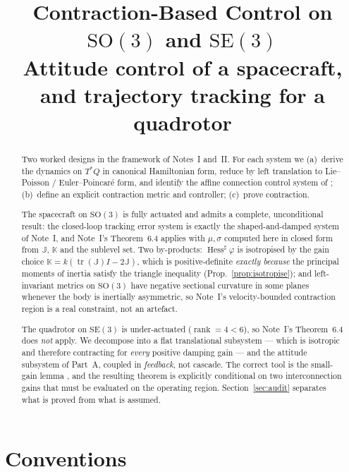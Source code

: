 \documentclass[11pt,a4paper]{article}
\title{\bfseries Contraction-Based Control on $\mathrm{SO}(3)$ and $\mathrm{SE}(3)$\\[3pt]
\large Attitude control of a spacecraft, and trajectory tracking for a quadrotor}
\date{}
\author{}
\newcommand{\Jm}{\mathbb{J}}
\newcommand{\Km}{\mathbb{K}}
\newcommand{\Hess}{\operatorname{Hess}}
\newcommand{\SO}{\mathrm{SO}(3)}
\newcommand{\SE}{\mathrm{SE}(3)}
\newcommand{\tr}{\operatorname{tr}}
\DeclareMathOperator{\rank}{rank}
\theoremstyle{plain}
\theoremstyle{definition}
\theoremstyle{remark}
\begin{document}
\maketitle
\vspace{-2.4\baselineskip}

\begin{abstract}
\noindent
Two worked designs in the framework of Notes~I and~II. For each system we
(a)~derive the dynamics on $T^{*}Q$ in canonical Hamiltonian form, reduce by
left translation to Lie--Poisson / Euler--Poincar\'e form, and identify the
affine connection control system of \cite[\S4.6.3]{BL04}; (b)~define an explicit
contraction metric and controller; (c)~prove contraction.

The spacecraft on $\SO$ is fully actuated and admits a complete, unconditional
result: the closed-loop tracking error system is exactly the shaped-and-damped
system of Note~I, and Note~I's Theorem~6.4 applies with $\mu,\sigma$ computed here
in closed form from $\Jm$, $\Km$ and the sublevel set. Two by-products:
$\Hess^{\sharp}\varphi$ is isotropised by the gain choice
$\Km = k\left(\tr(\Jm)I - 2\Jm\right)$, which is positive-definite \emph{exactly
because} the principal moments of inertia satisfy the triangle inequality
(Prop.~\ref{prop:isotropise}); and left-invariant metrics on $\SO$ have negative
sectional curvature in some planes whenever the body is inertially asymmetric,
so Note~I's velocity-bounded contraction region is a real constraint, not an
artefact.

The quadrotor on $\SE$ is under-actuated ($\rank = 4 < 6$), so Note~I's
Theorem~6.4 does \emph{not} apply. We decompose into a flat translational
subsystem --- which is isotropic and therefore contracting for \emph{every}
positive damping gain --- and the attitude subsystem of Part~A, coupled in
\emph{feedback}, not cascade. The correct tool is the small-gain lemma
\cite[Lem.~3.2]{SB13}, and the resulting theorem is explicitly conditional on two
interconnection gains that must be evaluated on the operating region.
Section~\ref{sec:audit} separates what is proved from what is assumed.
\end{abstract}

\tableofcontents

\section{Conventions}
\label{sec:conv}
\end{document}

